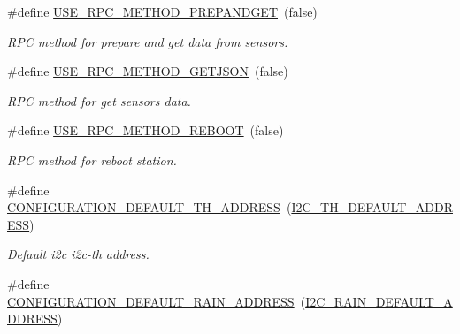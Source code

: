 \begin{DoxyCompactItemize}
\mbox{\label{rmap-config_8h_aa8cbe07c4e86c120d49d30c6fbd6f416}} 
\#define \hyperlink{rmap-config_8h_aa8cbe07c4e86c120d49d30c6fbd6f416}{U\+S\+E\+\_\+\+R\+P\+C\+\_\+\+M\+E\+T\+H\+O\+D\+\_\+\+P\+R\+E\+P\+A\+N\+D\+G\+ET}~(false)
\begin{DoxyCompactList}\small\item\em R\+PC method for prepare and get data from sensors. \end{DoxyCompactList}\item 
\mbox{\label{rmap-config_8h_a55c2193f88850b309aa4f7fb43892029}} 
\#define \hyperlink{rmap-config_8h_a55c2193f88850b309aa4f7fb43892029}{U\+S\+E\+\_\+\+R\+P\+C\+\_\+\+M\+E\+T\+H\+O\+D\+\_\+\+G\+E\+T\+J\+S\+ON}~(false)
\begin{DoxyCompactList}\small\item\em R\+PC method for get sensor\textquotesingle{}s data. \end{DoxyCompactList}\item 
\mbox{\label{rmap-config_8h_a8c9bb821ae7e25c56cbcca3ee495fd34}} 
\#define \hyperlink{rmap-config_8h_a8c9bb821ae7e25c56cbcca3ee495fd34}{U\+S\+E\+\_\+\+R\+P\+C\+\_\+\+M\+E\+T\+H\+O\+D\+\_\+\+R\+E\+B\+O\+OT}~(false)
\begin{DoxyCompactList}\small\item\em R\+PC method for reboot station. \end{DoxyCompactList}\item 
\mbox{\label{rmap-config_8h_a413cd84e34db40559ab834cc89408cdb}} 
\#define \hyperlink{rmap-config_8h_a413cd84e34db40559ab834cc89408cdb}{C\+O\+N\+F\+I\+G\+U\+R\+A\+T\+I\+O\+N\+\_\+\+D\+E\+F\+A\+U\+L\+T\+\_\+\+T\+H\+\_\+\+A\+D\+D\+R\+E\+SS}~(\hyperlink{registers-th_8h_a66906eb81e92beab5f2076ac49996132}{I2\+C\+\_\+\+T\+H\+\_\+\+D\+E\+F\+A\+U\+L\+T\+\_\+\+A\+D\+D\+R\+E\+SS})
\begin{DoxyCompactList}\small\item\em Default i2c i2c-\/th address. \end{DoxyCompactList}\item 
\mbox{\label{rmap-config_8h_a682b556c001cdf90f49b3a4d19081fb3}} 
\#define \hyperlink{rmap-config_8h_a682b556c001cdf90f49b3a4d19081fb3}{C\+O\+N\+F\+I\+G\+U\+R\+A\+T\+I\+O\+N\+\_\+\+D\+E\+F\+A\+U\+L\+T\+\_\+\+R\+A\+I\+N\+\_\+\+A\+D\+D\+R\+E\+SS}~(\hyperlink{registers-rain_8h_a2aebb0ca4cdf424c57dee6f591c40e0c}{I2\+C\+\_\+\+R\+A\+I\+N\+\_\+\+D\+E\+F\+A\+U\+L\+T\+\_\+\+A\+D\+D\+R\+E\+SS})

\end{DoxyCompactItemize}
